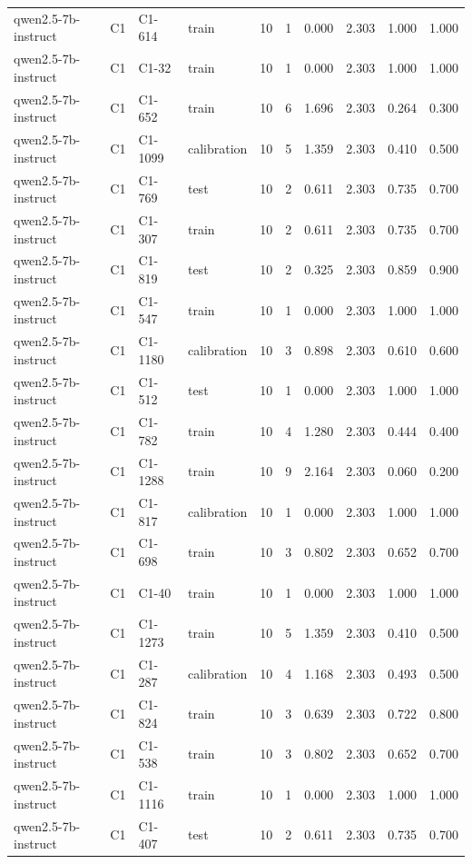 \begin{table}
\begin{tabular}{llllrrrrrr}
qwen2.5-7b-instruct & C1 & C1-614 & train & 10 & 1 & 0.000 & 2.303 & 1.000 & 1.000 \\
qwen2.5-7b-instruct & C1 & C1-32 & train & 10 & 1 & 0.000 & 2.303 & 1.000 & 1.000 \\
qwen2.5-7b-instruct & C1 & C1-652 & train & 10 & 6 & 1.696 & 2.303 & 0.264 & 0.300 \\
qwen2.5-7b-instruct & C1 & C1-1099 & calibration & 10 & 5 & 1.359 & 2.303 & 0.410 & 0.500 \\
qwen2.5-7b-instruct & C1 & C1-769 & test & 10 & 2 & 0.611 & 2.303 & 0.735 & 0.700 \\
qwen2.5-7b-instruct & C1 & C1-307 & train & 10 & 2 & 0.611 & 2.303 & 0.735 & 0.700 \\
qwen2.5-7b-instruct & C1 & C1-819 & test & 10 & 2 & 0.325 & 2.303 & 0.859 & 0.900 \\
qwen2.5-7b-instruct & C1 & C1-547 & train & 10 & 1 & 0.000 & 2.303 & 1.000 & 1.000 \\
qwen2.5-7b-instruct & C1 & C1-1180 & calibration & 10 & 3 & 0.898 & 2.303 & 0.610 & 0.600 \\
qwen2.5-7b-instruct & C1 & C1-512 & test & 10 & 1 & 0.000 & 2.303 & 1.000 & 1.000 \\
qwen2.5-7b-instruct & C1 & C1-782 & train & 10 & 4 & 1.280 & 2.303 & 0.444 & 0.400 \\
qwen2.5-7b-instruct & C1 & C1-1288 & train & 10 & 9 & 2.164 & 2.303 & 0.060 & 0.200 \\
qwen2.5-7b-instruct & C1 & C1-817 & calibration & 10 & 1 & 0.000 & 2.303 & 1.000 & 1.000 \\
qwen2.5-7b-instruct & C1 & C1-698 & train & 10 & 3 & 0.802 & 2.303 & 0.652 & 0.700 \\
qwen2.5-7b-instruct & C1 & C1-40 & train & 10 & 1 & 0.000 & 2.303 & 1.000 & 1.000 \\
qwen2.5-7b-instruct & C1 & C1-1273 & train & 10 & 5 & 1.359 & 2.303 & 0.410 & 0.500 \\
qwen2.5-7b-instruct & C1 & C1-287 & calibration & 10 & 4 & 1.168 & 2.303 & 0.493 & 0.500 \\
qwen2.5-7b-instruct & C1 & C1-824 & train & 10 & 3 & 0.639 & 2.303 & 0.722 & 0.800 \\
qwen2.5-7b-instruct & C1 & C1-538 & train & 10 & 3 & 0.802 & 2.303 & 0.652 & 0.700 \\
qwen2.5-7b-instruct & C1 & C1-1116 & train & 10 & 1 & 0.000 & 2.303 & 1.000 & 1.000 \\
qwen2.5-7b-instruct & C1 & C1-407 & test & 10 & 2 & 0.611 & 2.303 & 0.735 & 0.700 \\

\end{tabular}
\end{table}
